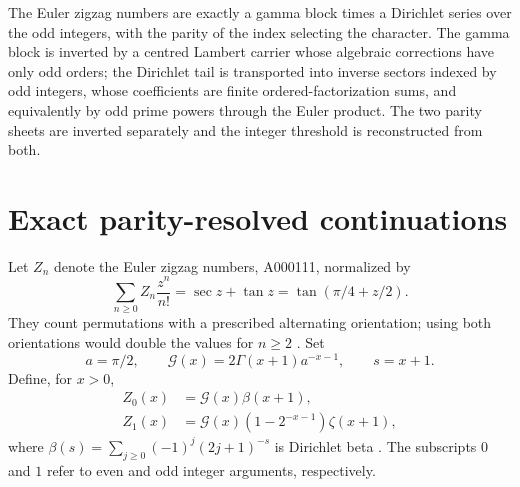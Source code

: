 \documentclass[11pt,openany]{book}
\numberwithin{equation}{chapter}
\theoremstyle{plain}
\theoremstyle{definition}
\theoremstyle{remark}
\begin{document}
The Euler zigzag numbers are exactly a gamma block times a Dirichlet series
over the odd integers, with the parity of the index selecting the character.
The gamma block is inverted by a centred Lambert carrier whose algebraic
corrections have only odd orders; the Dirichlet tail is transported into
inverse sectors indexed by odd integers, whose coefficients are finite
ordered-factorization sums, and equivalently by odd prime powers through
the Euler product.  The two parity sheets are inverted separately and the
integer threshold is reconstructed from both.

\section{Exact parity-resolved continuations}
Let $Z_n$ denote the Euler zigzag numbers, A000111, normalized by
\begin{equation}
 \sum_{n\ge0}Z_n\frac{z^n}{n!}=\sec z+\tan z
 =\tan(\pi/4+z/2).
 \label{t1:eq:zigzagegf}
\end{equation}
They count permutations with a prescribed alternating orientation; using both orientations would double the values for $n\ge2$ \cite{oeiszigzag}. Set
\begin{equation}
 a=\pi/2,\qquad \mathcal G(x)=2\Gamma(x+1)a^{-x-1},\qquad s=x+1.
 \label{t1:eq:zigzaggamma}
\end{equation}
Define, for $x>0$,
\begin{align}
 Z_0(x)&=\mathcal G(x)\beta(x+1),\nonumber\\
 Z_1(x)&=\mathcal G(x)(1-2^{-x-1})\zeta(x+1),
 \label{t1:eq:zigzaginterp}
\end{align}
where $\beta(s)=\sum_{j\ge0}(-1)^j(2j+1)^{-s}$ is Dirichlet beta \cite{wlbeta}. The subscripts $0$ and $1$ refer to even and odd integer arguments, respectively.
\end{document}
